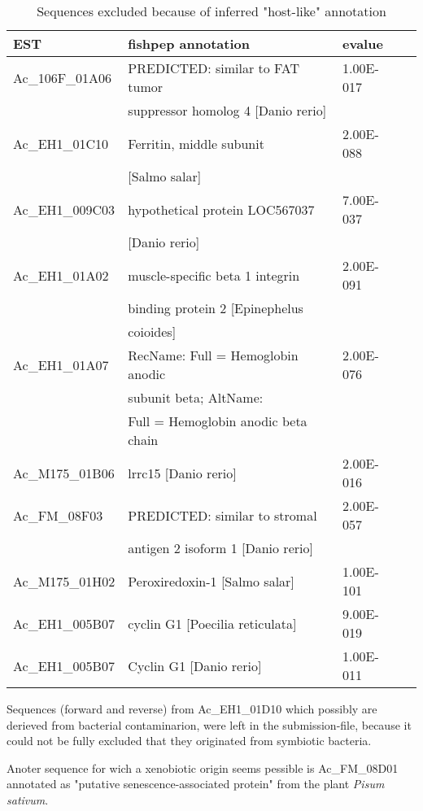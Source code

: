 \documentclass[12pt,a4paper]{article}
\begin{document}
\begin{table}[h]
  \centering
  \begin{tabular}{llll} 
    EST&fishpep annotation&evalue\\
    \hline
    Ac\_106F\_01A06& PREDICTED: similar to FAT tumor&1.00E-017\\
    &suppressor homolog 4 [Danio rerio]\\
    Ac\_EH1\_01C10 &Ferritin,  middle subunit       &2.00E-088  \\ 
    & [Salmo salar]                    \\ 
    Ac\_EH1\_009C03&hypothetical protein LOC567037  &7.00E-037  \\ 
    & [Danio rerio]                    \\ 
    Ac\_EH1\_01A02&muscle-specific beta 1 integrin  &2.00E-091  \\ 
    &binding protein 2 [Epinephelus      \\ 
    &coioides]                           \\ 
    Ac\_EH1\_01A07&RecName: Full = Hemoglobin anodic  &2.00E-076  \\ 
    &subunit beta; AltName:            \\ 
    &Full = Hemoglobin anodic beta chain \\ 
    Ac\_M175\_01B06&lrrc15 [Danio rerio]            &2.00E-016  \\ 
    Ac\_FM\_08F03 &PREDICTED: similar to stromal    &2.00E-057  \\ 
    &antigen 2 isoform 1 [Danio rerio] \\ 
    Ac\_M175\_01H02&Peroxiredoxin-1 [Salmo salar]   &1.00E-101  \\ 
    Ac\_EH1\_005B07&cyclin G1 [Poecilia reticulata] &9.00E-019  \\ 
    Ac\_EH1\_005B07&Cyclin G1 [Danio rerio]         &1.00E-011  \\ 
    \hline 
\end{tabular}   
\caption{Sequences excluded because of inferred "host-like" annotation}
\label{tab:hostex}
\end{table}

Sequences (forward and reverse) from Ac\_EH1\_01D10 which possibly are
derieved from bacterial contaminarion, were left in the
submission-file, because it could not be fully excluded that they
originated from symbiotic bacteria.

Anoter sequence for wich a xenobiotic origin seems pessible is
Ac\_FM\_08D01 annotated as "putative senescence-associated protein"
from the plant \textit{Pisum sativum}.
\end{document}
